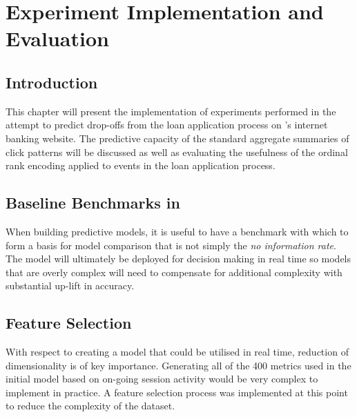 
\chapter{Experiment Implementation and Evaluation} %

\label{Chapter4} %


\section{Introduction}
This chapter will present the implementation of experiments performed in the attempt to predict drop-offs from the loan application process on \subjectname's internet banking website. The predictive capacity of the standard aggregate summaries of click patterns will be discussed as well as evaluating the usefulness of the ordinal rank encoding applied to events in the loan application process.


\section{Baseline Benchmarks in \subjectname\ }
When building predictive models, it is useful to have a benchmark with which to form a basis for model comparison that is not simply the \textit{no information rate}. The model will ultimately be deployed for decision making in real time so models that are overly complex will need to compensate for additional complexity with substantial up-lift in accuracy. 


\section{Feature Selection}
With respect to creating a model that could be utilised in real time, reduction of dimensionality is of key importance. Generating all of the 400 metrics used in the initial model based on on-going session activity would be very complex to implement in practice. A feature selection process was implemented at this point to reduce the complexity of the dataset. 
